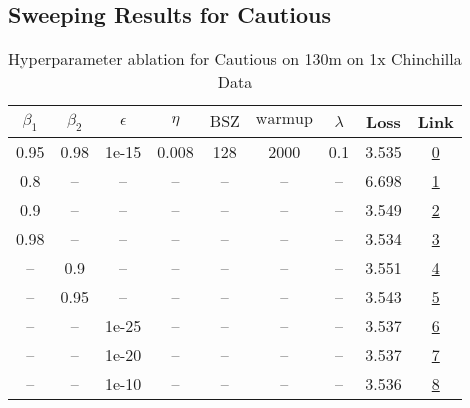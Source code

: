 \subsection{Sweeping Results for Cautious}%
\begin{table}[H]
\centering
\caption{Hyperparameter ablation for Cautious on 130m on 1x Chinchilla Data}
\label{tab:ablation_cautious_130m_1}
\begin{tabular}{ccccccccc}
\toprule
$\beta_1$ & $\beta_2$ & $\epsilon$ & $\eta$ & $\mathrm{BSZ}$ & $\mathrm{warmup}$ & $\lambda$ & Loss & Link \\
\midrule
0.95 & 0.98 & 1e-15 & 0.008 & 128 & 2000 & 0.1 & 3.535 & \href{https://wandb.ai/stanford-mercury/optimizer-scaling/runs/sweep-130m-2B-cautious7b0572lr0.008-wd0.1-minlr0-warmup2000-b10.-085cb0}{0} \\
\midrule
0.8 & -- & -- & -- & -- & -- & -- & 6.698 & \href{https://wandb.ai/stanford-mercury/optimizer-scaling/runs/sweep-130m-2B-cautious90e2dblr0.008-wd0.1-minlr0-warmup2000-b10.-3a5e65}{1} \\
0.9 & -- & -- & -- & -- & -- & -- & 3.549 & \href{https://wandb.ai/stanford-mercury/optimizer-scaling/runs/sweep-130m-2B-cautious5fbf2flr0.008-wd0.1-minlr0-warmup2000-b10.-8d12f3}{2} \\
0.98 & -- & -- & -- & -- & -- & -- & 3.534 & \href{https://wandb.ai/stanford-mercury/optimizer-scaling/runs/sweep-130m-2B-cautiousd41969lr0.008-wd0.1-minlr0-warmup2000-b10.-7d014c}{3} \\
-- & 0.9 & -- & -- & -- & -- & -- & 3.551 & \href{https://wandb.ai/stanford-mercury/optimizer-scaling/runs/sweep-130m-2B-cautious87fa48lr0.008-wd0.1-minlr0-warmup2000-b10.-dff836}{4} \\
-- & 0.95 & -- & -- & -- & -- & -- & 3.543 & \href{https://wandb.ai/stanford-mercury/optimizer-scaling/runs/sweep-130m-2B-cautious04bad0lr0.008-wd0.1-minlr0-warmup2000-b10.-15c6af}{5} \\
-- & -- & 1e-25 & -- & -- & -- & -- & 3.537 & \href{https://wandb.ai/stanford-mercury/optimizer-scaling/runs/sweep-130m-2B-cautious2a7d1dlr0.008-wd0.1-minlr0-warmup2000-b10.-ff7d5f}{6} \\
-- & -- & 1e-20 & -- & -- & -- & -- & 3.537 & \href{https://wandb.ai/stanford-mercury/optimizer-scaling/runs/sweep-130m-2B-cautious24891dlr0.008-wd0.1-minlr0-warmup2000-b10.-883f16}{7} \\
-- & -- & 1e-10 & -- & -- & -- & -- & 3.536 & \href{https://wandb.ai/stanford-mercury/optimizer-scaling/runs/sweep-130m-2B-cautious8f13a4lr0.008-wd0.1-minlr0-warmup2000-b10.-3b6c32}{8} \\

\end{tabular}
\end{table}

